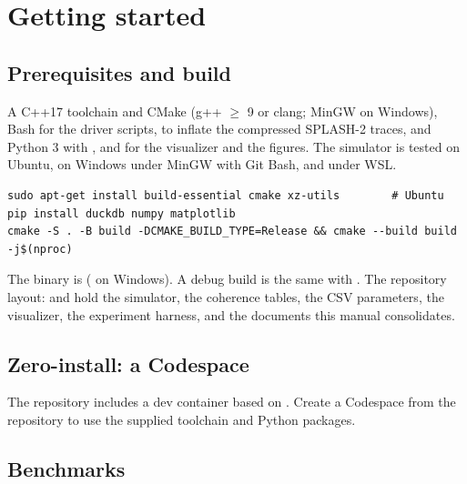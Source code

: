 \chapter{Getting started}\label{ch:getting-started}


\section{Prerequisites and build}

A C++17 toolchain and CMake (g++ $\geq$ 9 or clang; MinGW on Windows), Bash for the driver
scripts,  to inflate the compressed SPLASH-2 traces, and Python 3 with ,
 and  for the visualizer and the figures. The simulator is tested on
Ubuntu, on Windows under MinGW with Git Bash, and under WSL.

\begin{lstlisting}[style=shell]
sudo apt-get install build-essential cmake xz-utils        # Ubuntu
pip install duckdb numpy matplotlib
cmake -S . -B build -DCMAKE_BUILD_TYPE=Release && cmake --build build -j$(nproc)
\end{lstlisting}

The binary is  ( on Windows). A debug build is the
same with . The repository layout:  and
 hold the simulator,  the coherence tables,
 the CSV parameters,  the visualizer,
 the experiment harness, and  the documents this manual consolidates.

\section{Zero-install: a Codespace}

The repository includes a dev container based on .
Create a Codespace from the repository to use the supplied toolchain and Python packages.

\section{Benchmarks}

